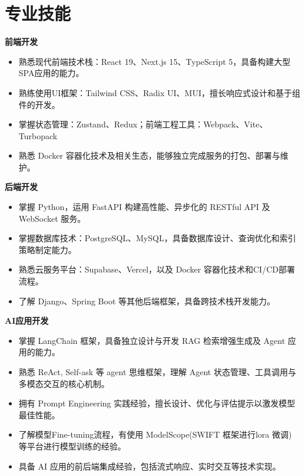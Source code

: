 \documentclass{resume}
\begin{document}
\vspace{-2ex}
\section{专业技能}
\textbf{前端开发}
    \begin{itemize}
        \item 熟悉现代前端技术栈：React 19、Next.js 15、TypeScript 5，具备构建大型SPA应用的能力。
        \item 熟练使用UI框架：Tailwind CSS、Radix UI、MUI，擅长响应式设计和基于组件的开发。
        \item 掌握状态管理：Zustand、Redux；前端工程工具：Webpack、Vite、Turbopack
        \item 熟悉 Docker 容器化技术及相关生态，能够独立完成服务的打包、部署与维护。
    \end{itemize}
    
\textbf{后端开发}
    \begin{itemize}
        \item 掌握 Python，运用 FastAPI 构建高性能、异步化的 RESTful API 及 WebSocket 服务。
        \item 掌握数据库技术：PostgreSQL、MySQL，具备数据库设计、查询优化和索引策略制定能力。
        \item 熟悉云服务平台：Supabase、Vercel，以及 Docker 容器化技术和CI/CD部署流程。
        \item 了解 Django、Spring Boot 等其他后端框架，具备跨技术栈开发能力。
    \end{itemize}



\textbf{AI应用开发}
    \begin{itemize}
        \item 掌握 LangChain 框架，具备独立设计与开发 RAG 检索增强生成及 Agent 应用的能力。
        \item 熟悉 ReAct, Self-ask 等 agent 思维框架，理解 Agent 状态管理、工具调用与多模态交互的核心机制。
        \item 拥有 Prompt Engineering 实践经验，擅长设计、优化与评估提示以激发模型最佳性能。
        \item 了解模型Fine-tuning流程，有使用 ModelScope(SWIFT 框架进行lora 微调) 等平台进行模型训练的经验。
        \item 具备 AI 应用的前后端集成经验，包括流式响应、实时交互等技术实现。
    \end{itemize}
\end{document}
